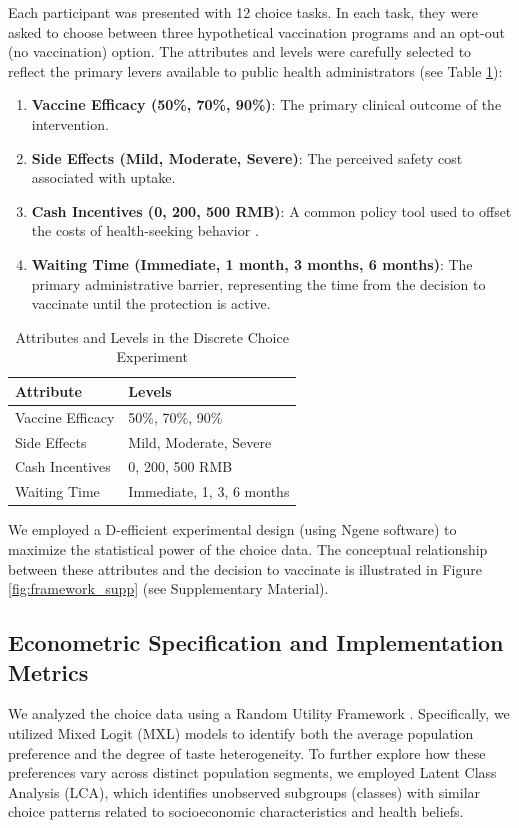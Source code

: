 \documentclass[preprint,12pt,authoryear]{elsarticle}
\begin{document}
Each participant was presented with 12 choice tasks. In each task, they were asked to choose between three hypothetical vaccination programs and an opt-out (no vaccination) option. The attributes and levels were carefully selected to reflect the primary levers available to public health administrators (see Table \ref{tab:attributes}):
\begin{enumerate}[label=(\arabic*)]
    \item \textbf{Vaccine Efficacy (50\%, 70\%, 90\%)}: The primary clinical outcome of the intervention.
    \item \textbf{Side Effects (Mild, Moderate, Severe)}: The perceived safety cost associated with uptake.
    \item \textbf{Cash Incentives (0, 200, 500 RMB)}: A common policy tool used to offset the costs of health-seeking behavior \citep{Bechtel2023}.
    \item \textbf{Waiting Time (Immediate, 1 month, 3 months, 6 months)}: The primary administrative barrier, representing the time from the decision to vaccinate until the protection is active.
\end{enumerate}

\begin{table}[ht]
\centering
\caption{Attributes and Levels in the Discrete Choice Experiment}
\label{tab:attributes}
\begin{tabular}{ll}
\toprule
Attribute & Levels \\
\midrule
Vaccine Efficacy & 50\%, 70\%, 90\% \\
Side Effects & Mild, Moderate, Severe \\
Cash Incentives & 0, 200, 500 RMB \\
Waiting Time & Immediate, 1, 3, 6 months \\
\bottomrule
\end{tabular}
\end{table}

We employed a D-efficient experimental design (using Ngene software) to maximize the statistical power of the choice data. The conceptual relationship between these attributes and the decision to vaccinate is illustrated in Figure \ref{fig:framework_supp} (see Supplementary Material).

\subsection{Econometric Specification and Implementation Metrics}
We analyzed the choice data using a Random Utility Framework \citep{mcfadden2001, Train2009, Hole2007}. Specifically, we utilized Mixed Logit (MXL) models to identify both the average population preference and the degree of taste heterogeneity. To further explore how these preferences vary across distinct population segments, we employed Latent Class Analysis (LCA), which identifies unobserved subgroups (classes) with similar choice patterns related to socioeconomic characteristics and health beliefs.
\end{document}
